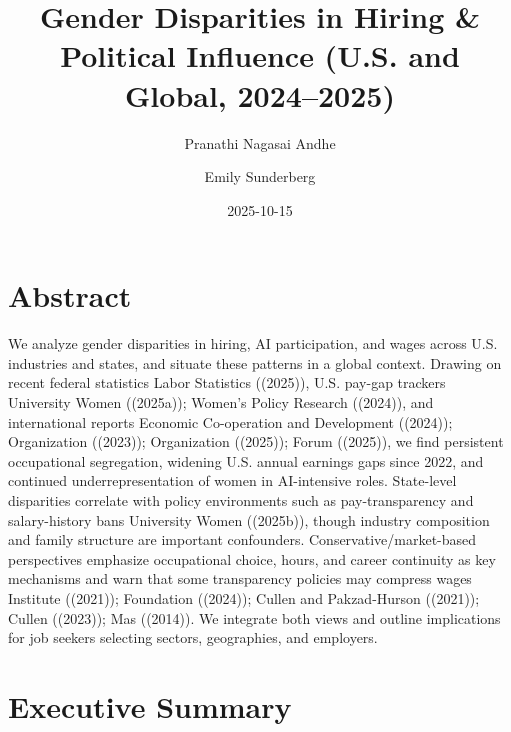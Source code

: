 \documentclass[
  letterpaper,
  DIV=11,
  numbers=noendperiod]{scrartcl}
\title{Gender Disparities in Hiring \& Political Influence (U.S. and
Global, 2024--2025)}
\author{Pranathi Nagasai Andhe \and Emily Sunderberg}
\date{2025-10-15}
\renewcommand*\contentsname{Table of contents}
\newcommand\contentsname{Table of contents}
\begin{document}
\maketitle

\renewcommand*\contentsname{Table of contents}
{
\hypersetup{linkcolor=}
\setcounter{tocdepth}{3}
\tableofcontents
}
\section{Abstract}\label{abstract}

We analyze gender disparities in hiring, AI participation, and wages
across U.S. industries and states, and situate these patterns in a
global context. Drawing on recent federal statistics Labor Statistics
((2025)), U.S. pay-gap trackers University Women ((2025a)); Women's
Policy Research ((2024)), and international reports Economic
Co-operation and Development ((2024)); Organization ((2023));
Organization ((2025)); Forum ((2025)), we find persistent occupational
segregation, widening U.S. annual earnings gaps since 2022, and
continued underrepresentation of women in AI-intensive roles.
State-level disparities correlate with policy environments such as
pay-transparency and salary-history bans University Women ((2025b)),
though industry composition and family structure are important
confounders. Conservative/market-based perspectives emphasize
occupational choice, hours, and career continuity as key mechanisms and
warn that some transparency policies may compress wages Institute
((2021)); Foundation ((2024)); Cullen and Pakzad-Hurson ((2021)); Cullen
((2023)); Mas ((2014)). We integrate both views and outline implications
for job seekers selecting sectors, geographies, and employers.

\section{Executive Summary}\label{executive-summary}
\end{document}
